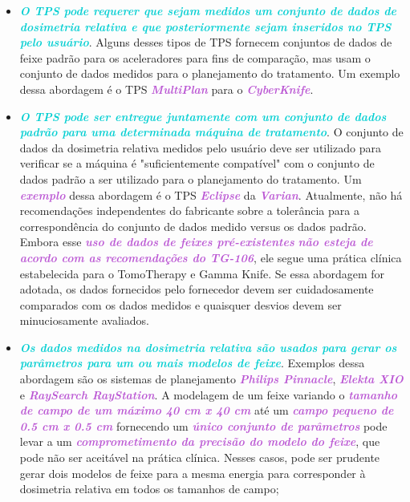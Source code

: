 \documentclass[11pt,a4paper]{article}
\newcounter{exemplo}
\begin{document}
	\begin{itemize}[label=\textcolor{CarnationPink}{$\blacktriangleright$}]
		\item \textcolor{DarkTurquoise}{\textbf{\textit{O TPS pode requerer que sejam medidos um conjunto de dados de dosimetria relativa e que posteriormente sejam inseridos no TPS pelo usuário}}}. Alguns desses tipos de TPS fornecem conjuntos de dados de feixe padrão para os aceleradores para fins de comparação, mas usam o conjunto de dados medidos para o planejamento do tratamento. Um exemplo dessa abordagem é o  TPS \textcolor{MediumOrchid}{\textbf{\textit{MultiPlan}}} para o \textcolor{MediumOrchid}{\textbf{\textit{CyberKnife}}}.
		
		\item \textcolor{DarkTurquoise}{\textbf{\textit{O TPS pode ser entregue juntamente com um conjunto de dados padrão para uma determinada máquina de tratamento}}}. O conjunto de dados da dosimetria relativa medidos pelo usuário deve ser utilizado para verificar se a máquina é "suficientemente compatível" com o conjunto de dados padrão a ser utilizado para o planejamento do tratamento. Um \textcolor{MediumOrchid}{\textbf{\textit{exemplo}}} dessa abordagem é o TPS \textcolor{MediumOrchid}{\textbf{\textit{Eclipse}}} da \textcolor{MediumOrchid}{\textbf{\textit{Varian}}}. Atualmente, não há recomendações independentes do fabricante sobre a tolerância para a correspondência do conjunto de dados medido versus os dados padrão. Embora esse \textcolor{MediumOrchid}{\textbf{\textit{uso de dados de feixes pré-existentes}}} \textcolor{MediumOrchid}{\textbf{\textit{não esteja de acordo com as recomendações do TG-106}}}, ele segue uma prática clínica estabelecida para o TomoTherapy e Gamma Knife. Se essa abordagem for adotada, os dados fornecidos pelo fornecedor devem ser cuidadosamente comparados com os dados medidos e quaisquer desvios devem ser minuciosamente avaliados.
		
		\item \textcolor{DarkTurquoise}{\textbf{\textit{Os dados medidos na dosimetria relativa são usados para gerar os parâmetros para um ou mais modelos de feixe}}}. Exemplos dessa abordagem são os sistemas de planejamento \textcolor{MediumOrchid}{\textbf{\textit{Philips Pinnacle}}}, \textcolor{MediumOrchid}{\textbf{\textit{Elekta XIO}}} e \textcolor{MediumOrchid}{\textbf{\textit{RaySearch RayStation}}}. A modelagem de um feixe variando o \textcolor{MediumOrchid}{\textbf{\textit{tamanho de campo de um máximo 40 cm x 40 cm}}} até um \textcolor{MediumOrchid}{\textbf{\textit{campo pequeno de 0.5 cm x 0.5 cm}}} fornecendo um \textcolor{MediumOrchid}{\textbf{\textit{único conjunto de parâmetros}}} pode levar a um \textcolor{MediumOrchid}{\textbf{\textit{comprometimento da precisão do modelo do feixe}}}, que pode não ser aceitável na prática clínica. Nesses casos, pode ser prudente gerar dois modelos de feixe para a mesma energia  para corresponder à dosimetria relativa em todos os tamanhos de campo;
		

\end{itemize}
\end{document}

